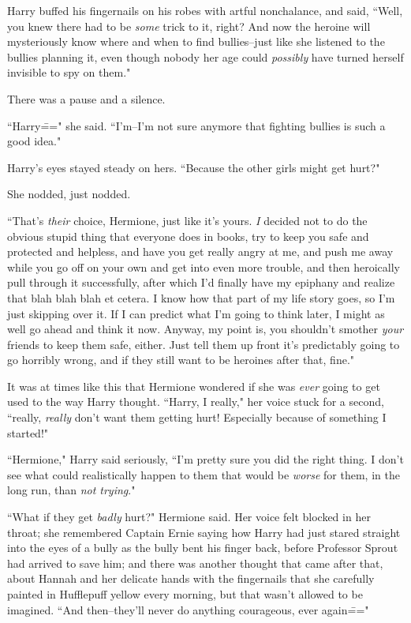 Harry buffed his fingernails on his robes with artful nonchalance, and said, ``Well, you knew there had to be \emph{some} trick to it, right? And now the heroine will mysteriously know where and when to find bullies\---just like she listened to the bullies planning it, even though nobody her age could \emph{possibly} have turned herself invisible to spy on them."

There was a pause and a silence.

``Harry\===" she said. ``I'm\---I'm not sure anymore that fighting bullies is such a good idea."

Harry's eyes stayed steady on hers. ``Because the other girls might get hurt?"

She nodded, just nodded.

``That's \emph{their} choice, Hermione, just like it's yours. \emph{I} decided not to do the obvious stupid thing that everyone does in books, try to keep you safe and protected and helpless, and have you get really angry at me, and push me away while you go off on your own and get into even more trouble, and then heroically pull through it successfully, after which I'd finally have my epiphany and realize that blah blah blah et cetera. I know how that part of my life story goes, so I'm just skipping over it. If I can predict what I'm going to think later, I might as well go ahead and think it now. Anyway, my point is, you shouldn't smother \emph{your} friends to keep them safe, either. Just tell them up front it's predictably going to go horribly wrong, and if they still want to be heroines after that, fine."

It was at times like this that Hermione wondered if she was \emph{ever} going to get used to the way Harry thought. ``Harry, I really," her voice stuck for a second, ``really, \emph{really} don't want them getting hurt! Especially because of something I started!"

``Hermione," Harry said seriously, ``I'm pretty sure you did the right thing. I don't see what could realistically happen to them that would be \emph{worse} for them, in the long run, than \emph{not trying}."

``What if they get \emph{badly} hurt?" Hermione said. Her voice felt blocked in her throat; she remembered Captain Ernie saying how Harry had just stared straight into the eyes of a bully as the bully bent his finger back, before Professor Sprout had arrived to save him; and there was another thought that came after that, about Hannah and her delicate hands with the fingernails that she carefully painted in Hufflepuff yellow every morning, but that wasn't allowed to be imagined. ``And then\---they'll never do anything courageous, ever again\==="

